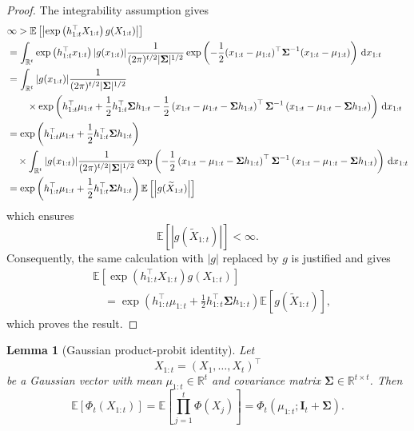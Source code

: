 \documentclass[11pt,authoryear]{elsarticle}
\def\Real{\mathbb{R}}
\def\E#1{{\mathbb E}\left[#1\right]}
\newtheorem{lemma}{Lemma}
\theoremstyle{nopunct}
\numberwithin{equation}{section}
\begin{document}
\begin{proof}
The integrability assumption gives
\[
\begin{aligned}
&\infty
>
\E{
\left|
\exp\left(h_{1:t}^{\top}X_{1:t}\right)
g(X_{1:t})
\right|
}\\
&=
\int_{\Real^t}
\exp\left(h_{1:t}^{\top}x_{1:t}\right)
|g(x_{1:t})|
\frac{1}
{(2\pi)^{t/2}|\boldsymbol\Sigma|^{1/2}}
\exp\left(
-\frac12
(x_{1:t}-\mu_{1:t})^\top
\boldsymbol\Sigma^{-1}
(x_{1:t}-\mu_{1:t})
\right)
\,{\rm d}x_{1:t}\\
&=
\int_{\Real^t}
|g(x_{1:t})|
\frac{1}
{(2\pi)^{t/2}|\boldsymbol\Sigma|^{1/2}}\\
&\qquad\times
\exp\left(
h_{1:t}^{\top}\mu_{1:t}
+
\frac12
h_{1:t}^{\top}\boldsymbol\Sigma h_{1:t}
-\frac12
\left(
x_{1:t}-\mu_{1:t}-\boldsymbol\Sigma h_{1:t}
\right)^\top
\boldsymbol\Sigma^{-1}
\left(
x_{1:t}-\mu_{1:t}-\boldsymbol\Sigma h_{1:t}
\right)
\right)
\,{\rm d}x_{1:t}\\
&=
\exp\left(
h_{1:t}^{\top}\mu_{1:t}
+
\frac12
h_{1:t}^{\top}\boldsymbol\Sigma h_{1:t}
\right)\\
&\quad\times
\int_{\Real^t}
|g(x_{1:t})|
\frac{1}
{(2\pi)^{t/2}|\boldsymbol\Sigma|^{1/2}}
\exp\left(
-\frac12
\left(
x_{1:t}-\mu_{1:t}-\boldsymbol\Sigma h_{1:t}
\right)^\top
\boldsymbol\Sigma^{-1}
\left(
x_{1:t}-\mu_{1:t}-\boldsymbol\Sigma h_{1:t}
\right)
\right)
\,{\rm d}x_{1:t}\\
&=
\exp\left(
h_{1:t}^{\top}\mu_{1:t}
+
\frac12
h_{1:t}^{\top}\boldsymbol\Sigma h_{1:t}
\right)
\E{
\left|g(\widetilde X_{1:t})\right|
}
\end{aligned}
\]
which ensures
\[
\E{
\left|g(\widetilde X_{1:t})\right|
}
<\infty.
\]
Consequently, the same calculation with \(|g|\) replaced by \(g\) is
justified and gives
\[
\begin{aligned}
&\E{
\exp\left(h_{1:t}^{\top}X_{1:t}\right)
g(X_{1:t})
}\\
&\quad =
\exp\left(
h_{1:t}^{\top}\mu_{1:t}
+
\frac12
h_{1:t}^{\top}\boldsymbol\Sigma h_{1:t}
\right)
\E{
g(\widetilde X_{1:t})
},
\end{aligned}
\]
which proves the result.
\end{proof}


\begin{lemma}[Gaussian product-probit identity]
\label{lem.5}
Let
\[
X_{1:t}=(X_1,\ldots,X_t)^\top
\]
be a Gaussian vector with mean
\(\mu_{1:t}\in\Real^t\) and covariance matrix
\(\boldsymbol\Sigma\in\Real^{t\times t}\). Then
\[
\E{\Phi_{t}(X_{1:t})}
=
\E{
\prod_{j=1}^t
\Phi(X_j)
}
=
\Phi_t
\left(
\mu_{1:t};
\boldsymbol I_t+\boldsymbol\Sigma
\right).
\]
\end{lemma}
\end{document}
